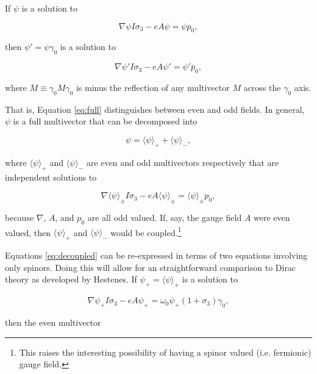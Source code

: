\documentclass{article}
\begin{document}
  If $\psi$ is a solution to

  \begin{equation}
    \nabla \psi I \sigma_3 - e A \psi = \psi p_0,\label{eq:plus}
  \end{equation}

  then $\psi' = \psi \gamma_0$ is a solution to

  \begin{equation}
    \nabla \psi' I \sigma_3 - e A \psi' = \psi' \overline p_0, \label{eq:minus}
  \end{equation}

  where $\overline M \equiv \gamma_0 M\gamma_0$ is minus the reflection of any multivector $M$ across the $\gamma_0$ axis.

  That is, Equation \ref{eq:full} distinguishes between even and odd fields. In general, $\psi$ is a full multivector that can be decomposed into

  \begin{equation}
    \psi = \langle \psi \rangle_+ + \langle \psi \rangle_-,
  \end{equation}

  where $\langle \psi \rangle_+$ and $\langle \psi \rangle_-$ are even and odd multivectors respectively that are independent solutions to

  \begin{equation}
    \nabla \langle \psi \rangle_\pm I \sigma_3 - e A \langle \psi \rangle_\pm = \langle \psi \rangle_\pm p_0,\label{eq:decoupled}
  \end{equation}

  because $\nabla$, $A$, and $p_0$ are all odd valued. If, say, the gauge field $A$ were even valued, then $\langle \psi \rangle_+$ and $\langle \psi \rangle_-$ would be coupled.\footnote{This raises the interesting possibility of having a spinor valued (i.e. fermionic) gauge field.}

  Equations \ref{eq:decoupled} can be re-expressed in terms of two equations involving only spinors. Doing this will allow for an straightforward comparison to Dirac theory as developed by Hestenes.\cite{hestenes} If $\psi_+ = \langle \psi \rangle_+$ is a solution to

  \begin{equation}
    \nabla \psi_+ I \sigma_3 - e A \psi_+ = \omega_0 \psi_+ (1 + \sigma_3) \gamma_0,\label{eq:even}
  \end{equation}

  then the even multivector 
\end{document}
